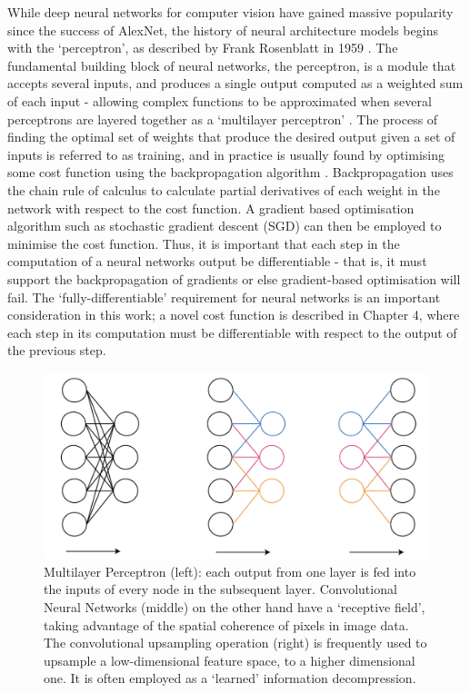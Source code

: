 While deep neural networks for computer vision have gained massive popularity since the success of AlexNet, the history of neural architecture models begins with the `perceptron', as described by Frank Rosenblatt in 1959 \cite{rosenblatt1959neurodynamics}. The fundamental building block of neural networks, the perceptron, is a module that accepts several inputs, and produces a single output computed as a weighted sum of each input - allowing complex functions to be approximated when several perceptrons are layered together as a `multilayer perceptron' \cite{minsky1969perceptrons}. The process of finding the optimal set of weights that produce the desired output given a set of inputs is referred to as training, and in practice is usually found by optimising some cost function using the backpropagation algorithm \cite{rumelhart1986backprop}. Backpropagation uses the chain rule of calculus to calculate partial derivatives of each weight in the network with respect to the cost function. A gradient based optimisation algorithm such as stochastic gradient descent (SGD) can then be employed to minimise the cost function. Thus, it is important that each step in the computation of a neural networks output be differentiable - that is, it must support the backpropagation of gradients or else gradient-based optimisation will fail. The `fully-differentiable' requirement for neural networks is an important consideration in this work; a novel cost function is described in Chapter 4, where each step in its computation must be differentiable with respect to the output of the previous step. 

\begin{figure}[tbp]
    \centering
    \includegraphics[width=5in]{images/cnnvsmlp.png}
    
    \caption[Multilayer perceptrons and convolutional networks]{Multilayer Perceptron (left): each output from one layer is fed into the inputs of every node in the subsequent layer. Convolutional Neural Networks (middle) on the other hand have a `receptive field', taking advantage of the spatial coherence of pixels in image data. The convolutional upsampling operation (right) is frequently used to upsample a low-dimensional feature space, to a higher dimensional one. It is often employed as a `learned' information decompression.}
    
    \label{convexhull}
\end{figure}



